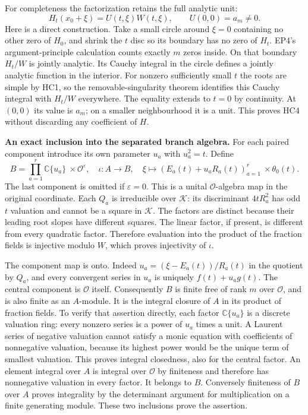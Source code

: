 For completeness the factorization retains the full analytic unit:
\[
 H_t(x_0+\xi)=U(t,\xi)W(t,\xi),\qquad U(0,0)=a_m\ne0.
 \tag{HC4}
\]
Here is a direct construction. Take a small circle around $\xi=0$
containing no other zero of $H_0$, and shrink the $t$ disc so its
boundary has no zero of $H_t$. EP4's argument-principle calculation
counts exactly $m$ zeros inside. On that boundary $H_t/W$ is
jointly analytic. Its Cauchy integral in the circle defines a
jointly analytic function in the interior. For nonzero sufficiently
small $t$ the roots are simple by HC1, so the removable-singularity
theorem identifies this Cauchy integral with $H_t/W$ everywhere.
The equality extends to $t=0$ by continuity. At $(0,0)$ its value
is $a_m$; on a smaller neighbourhood it is a unit. This proves HC4
without discarding any coefficient of $H$.

\HC\textbf{An exact inclusion into the separated branch algebra.}
For each paired component introduce its own parameter $u_a$ with
$u_a^2=t$. Define
\[
 B=\prod_{a=1}^r\mathbb C\{u_a\}\ \times\mathcal O^{\varepsilon},
 \quad
 \iota:A\longrightarrow B,\quad
 \xi\longmapsto
       (E_a(t)+u_aR_a(t))_{a=1}^r\ \times\theta_0(t).
 \tag{HC5}
\]
The last component is omitted if $\varepsilon=0$. This is a
unital $\mathcal O$-algebra map in the original coordinate.
Each $Q_a$ is irreducible over $\mathcal K$: its discriminant
$4tR_a^2$ has odd $t$ valuation and cannot be a square in
$\mathcal K$. The factors are distinct because their leading
root slopes have different squares. The linear factor, if present,
is different from every quadratic factor. Therefore evaluation
into the product of the fraction fields is injective modulo $W$,
which proves injectivity of $\iota$.

The component map is onto. Indeed
$u_a=(\xi-E_a(t))/R_a(t)$ in the quotient by $Q_a$, and
every convergent series in $u_a$ is uniquely $f(t)+u_ag(t)$.
The central component is $\mathcal O$ itself. Consequently $B$
is finite free of rank $m$ over $\mathcal O$, and is also finite
as an $A$-module. It is the integral closure of $A$ in its product
of fraction fields. To verify that assertion directly, each factor
$\mathbb C\{u_a\}$ is a discrete valuation ring: every nonzero
series is a power of $u_a$ times a unit. A Laurent series of negative
valuation cannot satisfy a monic equation with coefficients of
nonnegative valuation, because its highest power would be the unique
term of smallest valuation. This proves integral closedness, also
for the central factor. An element integral over $A$ is integral
over $\mathcal O$ by finiteness and therefore has nonnegative
valuation in every factor. It belongs to $B$. Conversely finiteness
of $B$ over $A$ proves integrality by the determinant argument for
multiplication on a finite generating module. These two inclusions
prove the assertion.

